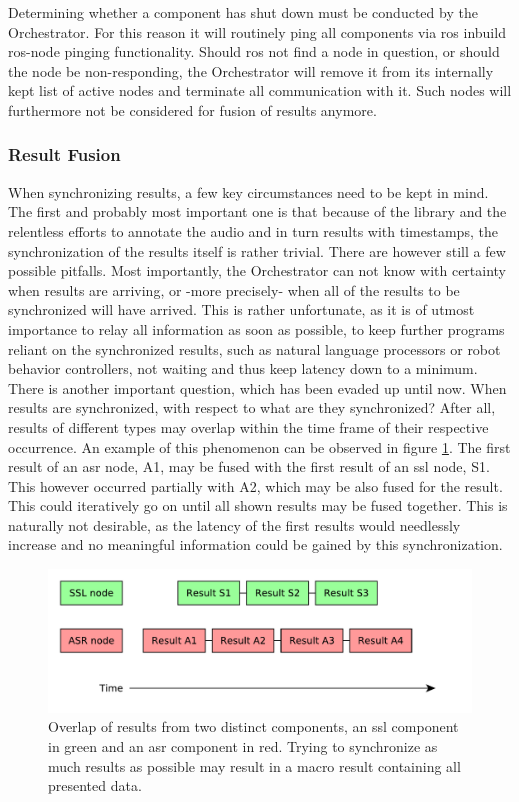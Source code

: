 Determining whether a component has shut down must be conducted by the Orchestrator.
For this reason it will routinely ping all components via \gls{ros} inbuild \gls{ros}-node pinging functionality.
Should \gls{ros} not find a node in question, or should the node be non-responding, the Orchestrator will remove it from its internally kept list of active nodes and terminate all communication with it.
Such nodes will furthermore not be considered for fusion of results anymore. 

\subsubsection{Result Fusion}

When synchronizing results, a few key circumstances need to be kept in mind.
The first and probably most important one is that because of the library and the relentless efforts to annotate the audio and in turn results with timestamps, the synchronization of the results itself is rather trivial.
There are however still a few possible pitfalls.
Most importantly, the Orchestrator can not know with certainty when results are arriving, or -more precisely- when all of the results to be synchronized will have arrived.
This is rather unfortunate, as it is of utmost importance to relay all information as soon as possible, to keep further programs reliant on the synchronized results, such as natural language processors or robot behavior controllers, not waiting and thus keep latency down to a minimum.
There is another important question, which has been evaded up until now.
When results are synchronized, with respect to what are they synchronized?
After all, results of different types may overlap within the time frame of their respective occurrence.
An example of this phenomenon can be observed in figure \ref{pic:main:orc:result_overlap}.
The first result of an \gls{asr} node, A1, may be fused with the first result of an \gls{ssl} node, S1.
This however occurred partially with A2, which may be also fused for the result.
This could iteratively go on until all shown results may be fused together.
This is naturally not desirable, as the latency of the first results would needlessly increase and no meaningful information could be gained by this synchronization.

\begin{figure}[]
	\centering
	\includegraphics[width=\textwidth]{diagrams/main_orc_result_overlap.pdf}
	\caption{Overlap of results from two distinct components, an \gls{ssl} component in green and an \gls{asr} component in red.
		Trying to synchronize as much results as possible may result in a macro result containing all presented data.}
	\label{pic:main:orc:result_overlap}
\end{figure}


